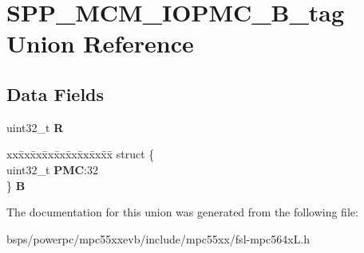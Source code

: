 \hypertarget{unionSPP__MCM__IOPMC__32B__tag}{}\section{S\+P\+P\+\_\+\+M\+C\+M\+\_\+\+I\+O\+P\+M\+C\+\_\+B\+\_\+tag Union Reference}
\label{unionSPP__MCM__IOPMC__32B__tag}
\subsection*{Data Fields}
\begin{DoxyCompactItemize}
\item 
\mbox{\label{unionSPP__MCM__IOPMC__32B__tag_ae6526c78f6b635fb3644f0cabcdee72c}} 
uint32\+\_\+t {\bfseries R}
\item 
\mbox{\label{unionSPP__MCM__IOPMC__32B__tag_a2896a439dcc3847ec564198c9b918401}} 
\begin{tabbing}
xx\=xx\=xx\=xx\=xx\=xx\=xx\=xx\=xx\=\kill
struct \{\\
\>uint32\_t {\bfseries PMC}:32\\
\} {\bfseries B}\\

\end{tabbing}\end{DoxyCompactItemize}


The documentation for this union was generated from the following file\+:\begin{DoxyCompactItemize}
\item 
bsps/powerpc/mpc55xxevb/include/mpc55xx/fsl-\/mpc564x\+L.\+h\end{DoxyCompactItemize}
